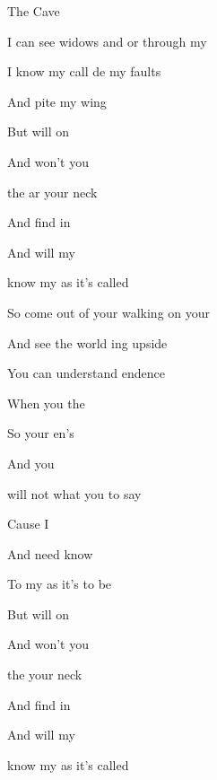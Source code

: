 \begin{SBSong}{The Cave}
\begin{SBVerse}
        I can see widows and or through my 
        
        I know my call de my faults
        
        And pite my wing   
  \end{SBVerse}
  \CBPageBrk
  \begin{SBVerse}
        But  will  on 
        
        And  won't  you 
        
         the  ar your neck
   
        And  find  in 
  
        And  will  my 
        
         know my  as it's called 
  \end{SBVerse}
  \WBPageBrk
  \begin{SBVerse}
        So come out of your  walking on your 
        
        And see the world ing upside 
        
        You can understand endence
        
        When you  the    
  \end{SBVerse}
  \begin{SBVerse}
        So  your en's 
        
        And   you 
        
         will not  what you  to say
        
        Cause I   
        
        And  need  know 
        
        To  my  as it's  to be
  \end{SBVerse}
  \begin{SBVerse}
        But  will  on 
        
        And  won't  you  
        
         the   your neck
   
        And  find  in 
  
        And  will  my 
        
         know my  as it's called    
  \end{SBVerse}
        
\end{SBSong}        
      
